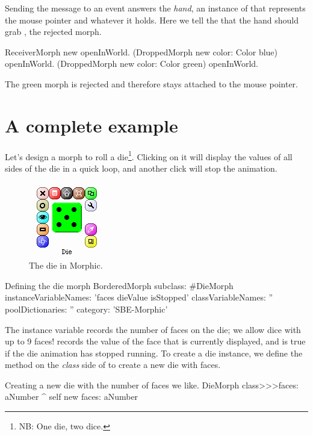 \documentclass[a4paper,10pt,twoside]{book}
\begin{document}
Sending the  message to an event answers the \emph{hand}, an instance of  that represents the mouse pointer and whatever it holds.
Here we tell the  that the hand should grab , the rejected morph.

\begin{code}{}
ReceiverMorph new openInWorld.
(DroppedMorph new color: Color blue) openInWorld.
(DroppedMorph new color: Color green) openInWorld.
\end{code}
\noindent
The green morph is rejected and therefore stays attached to the mouse pointer.

\section{A complete example}

Let's design a morph to roll a die\footnote{NB: One die, two dice.}. Clicking on it will display the values of all sides of the die in a quick loop, and another click will stop the animation.

\begin{figure}[ht]
	\centerline{\includegraphics[scale=0.65]{die}}
	\caption{The die in Morphic.
		\label{fig:dialogDie}}
\end{figure}


\begin{classdef}{Defining the die morph}
BorderedMorph subclass: #DieMorph
	instanceVariableNames: 'faces dieValue isStopped'
	classVariableNames: ''
	poolDictionaries: ''
	category: 'SBE-Morphic'
\end{classdef}

The instance variable  records the number of faces on the die; we allow dice with up to 9 faces!  records the value of the face that is currently displayed, and  is true if the die animation has stopped running.
To create a die instance, we define the  method on the \emph{class} side of  to create a new die with  faces.
\begin{method}{Creating a new die with the number of faces we like.}
DieMorph class>>>faces: aNumber
	^ self new faces: aNumber
\end{method}
\end{document}
